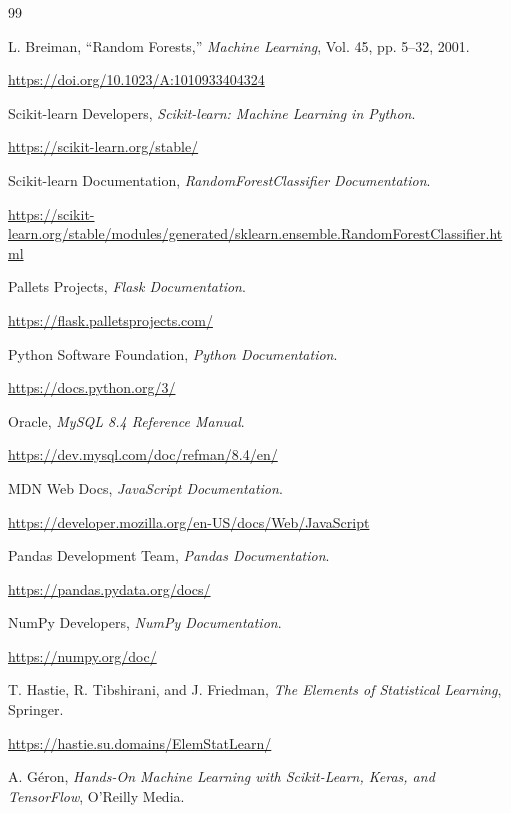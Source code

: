 \documentclass[12pt,a4paper]{report}
\begin{document}
\begin{thebibliography}{99}

L. Breiman,
``Random Forests,''
\textit{Machine Learning},
Vol. 45, pp. 5--32, 2001.

\url{https://doi.org/10.1023/A:1010933404324}

Scikit-learn Developers,
\textit{Scikit-learn: Machine Learning in Python}.

\url{https://scikit-learn.org/stable/}

Scikit-learn Documentation,
\textit{RandomForestClassifier Documentation}.

\url{https://scikit-learn.org/stable/modules/generated/sklearn.ensemble.RandomForestClassifier.html}

Pallets Projects,
\textit{Flask Documentation}.

\url{https://flask.palletsprojects.com/}

Python Software Foundation,
\textit{Python Documentation}.

\url{https://docs.python.org/3/}

Oracle,
\textit{MySQL 8.4 Reference Manual}.

\url{https://dev.mysql.com/doc/refman/8.4/en/}

MDN Web Docs,
\textit{JavaScript Documentation}.

\url{https://developer.mozilla.org/en-US/docs/Web/JavaScript}

Pandas Development Team,
\textit{Pandas Documentation}.

\url{https://pandas.pydata.org/docs/}

NumPy Developers,
\textit{NumPy Documentation}.

\url{https://numpy.org/doc/}

T. Hastie, R. Tibshirani, and J. Friedman,
\textit{The Elements of Statistical Learning},
Springer.

\url{https://hastie.su.domains/ElemStatLearn/}

A. G\'{e}ron,
\textit{Hands-On Machine Learning with Scikit-Learn, Keras, and TensorFlow},
O'Reilly Media.

\end{thebibliography}

\end{document}
